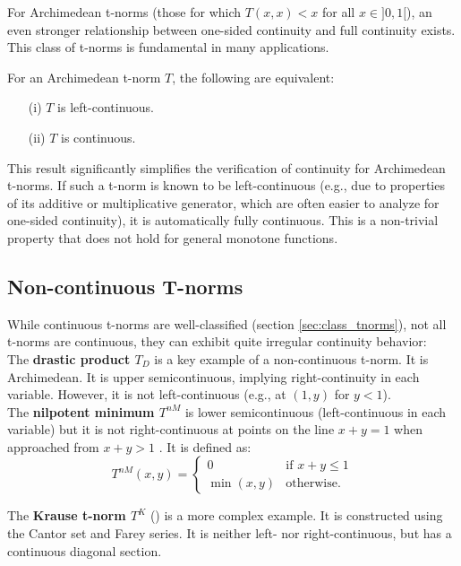 For Archimedean t-norms (those for which $T(x,x) < x$ for all $x \in ]0,1[$), an even stronger relationship between one-sided continuity and full continuity exists. This class of t-norms is fundamental in many applications.
\begin{proposition}
  For an Archimedean t-norm $T$, the following are equivalent:
  \begin{enumerate}
      \item[(i)] $T$ is left-continuous.
      \item[(ii)] $T$ is continuous.
  \end{enumerate}
\end{proposition}
This result significantly simplifies the verification of continuity for Archimedean t-norms. If such a t-norm is known to be left-continuous (e.g., due to properties of its additive or multiplicative generator, which are often easier to analyze for one-sided continuity), it is automatically fully continuous. This is a non-trivial property that does not hold for general monotone functions.

\subsection{Non-continuous T-norms}

While continuous t-norms are well-classified (section \ref{sec:class_tnorms}), not all t-norms are continuous, they can exhibit quite irregular continuity behavior:\\

The \textbf{drastic product $T_D$} is a key example of a non-continuous t-norm. It is Archimedean. It is upper semicontinuous, implying right-continuity in each variable. However, it is not left-continuous (e.g., at $(1,y)$ for $y<1$).\\

The \textbf{nilpotent minimum $T^{nM}$} is lower semicontinuous (left-continuous in each variable) but it is not right-continuous at points on the line $x+y=1$ when approached from $x+y>1$ \cite[Rem.~1.21(i)]{Klement2000}. It is defined as:
  \[
  T^{nM}(x,y) =
  \begin{cases}
    0 & \text{if } x+y \leq 1 \\
    \min(x,y) & \text{otherwise.}
  \end{cases}
  \]


The \textbf{Krause t-norm $T^K$} (\cite[App.~B.1]{Klement2000}) is a more complex example. It is constructed using the Cantor set and Farey series. It is neither left- nor right-continuous, but has a continuous diagonal section.

